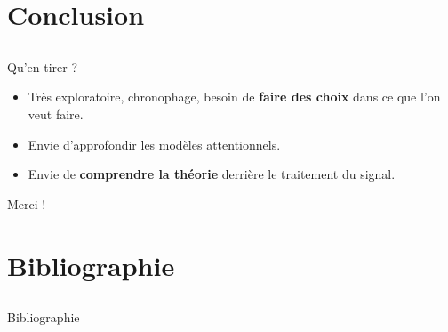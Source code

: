 \documentclass[compress,xcolor=table]{beamer}
\begin{document}
\section{Conclusion} \subsection{}

\begin{frame}{}

    \begin{block}{Qu'en tirer ?}
        \begin{itemize}
            \item Très exploratoire, chronophage, besoin de \textbf{faire des choix} dans ce que l'on veut faire.
            \item Envie d'approfondir les modèles attentionnels.
            \item Envie de \textbf{comprendre la théorie} derrière le traitement du signal.
        \end{itemize}
    \end{block}

    Merci !

\end{frame}

\section{Bibliographie} \subsection{}

\begin{frame}[allowframebreaks]{Bibliographie}

    \printbibliography[heading=none]

\end{frame}
\end{document}
